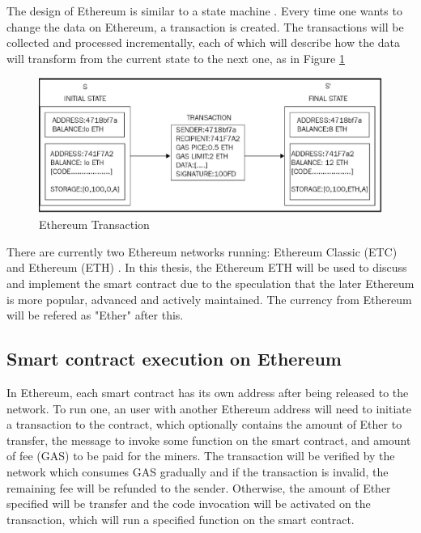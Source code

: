 \documentclass[twoside,numperchapter]{tutthesis} %
\begin{document}
The design of Ethereum is similar to a state machine \citep{RefWorks:doc:EthereumStateOfKnowledge}\citep{RefWorks:doc:MasteringBlockchain}\citep{RefWorks:doc:EthereumASecureDecentralizedTransaction}. Every time one wants to change the data on Ethereum, a transaction is created. The transactions will be collected and processed incrementally, each of which will describe how the data will transform from the current state to the next one, as in Figure \ref{fig:ethereum_transaction}

\begin{figure}
    \centering
    \includegraphics[width=\linewidth]{ethereum_transaction.jpg}
    \caption{Ethereum Transaction \citep{RefWorks:doc:MasteringBlockchain}}
    \label{fig:ethereum_transaction}
\end{figure}

There are currently two Ethereum networks running: Ethereum Classic (ETC) \citep{EthereumClassic} and Ethereum (ETH) \citep{Ethereum}. In this thesis, the Ethereum ETH will be used to discuss and implement the smart contract due to the speculation that the later Ethereum is more popular, advanced and actively maintained. The currency from Ethereum will be refered as "Ether" after this.

\subsection{Smart contract execution on Ethereum}

In Ethereum, each smart contract has its own address after being released to the network. To run one, an user with another Ethereum address will need to initiate a transaction to the contract, which optionally contains the amount of Ether to transfer, the message to invoke some function on the smart contract, and amount of fee (GAS) to be paid for the miners. The transaction will be verified by the network which consumes GAS gradually and if the transaction is invalid, the remaining fee will be refunded to the sender. Otherwise, the amount of Ether specified will be transfer and the code invocation will be activated on the transaction, which will run a specified function on the smart contract.
\end{document}
